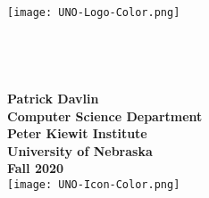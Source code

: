 \begin{center}
  \texttt{[image: UNO-Logo-Color.png]}
  \\[0.3in]
  \textbf{\courseListing{}}\\
  \courseName{}
  \\[0.75in]
  \textbf{\assignmentTitle{}}\\
  \assignmentSubtitle{}
  \\[0.75in]
  \textbf{Patrick Davlin}
  \\[0.75in]
  \textbf{Computer Science Department}\\
  \textbf{Peter Kiewit Institute}\\
  \textbf{University of Nebraska}
  \\[0.75in]
  \textbf{Fall 2020}
  \\[0.3in]
  \texttt{[image: UNO-Icon-Color.png]}
  \newpage
\end{center}